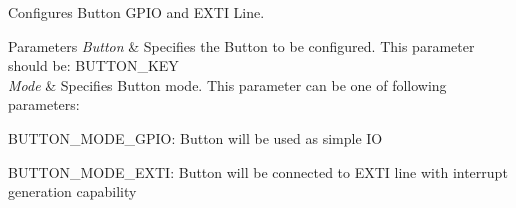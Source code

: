 Configures Button G\+P\+IO and E\+X\+TI Line. 


\begin{DoxyParams}{Parameters}
{\em Button} & Specifies the Button to be configured. This parameter should be\+: B\+U\+T\+T\+O\+N\+\_\+\+K\+EY \\
\hline
{\em Mode} & Specifies Button mode. This parameter can be one of following parameters\+: ~\newline
 \begin{DoxyItemize}
\item B\+U\+T\+T\+O\+N\+\_\+\+M\+O\+D\+E\+\_\+\+G\+P\+IO\+: Button will be used as simple IO \item B\+U\+T\+T\+O\+N\+\_\+\+M\+O\+D\+E\+\_\+\+E\+X\+TI\+: Button will be connected to E\+X\+TI line with interrupt generation capability \end{DoxyItemize}
\\
\hline
\end{DoxyParams}
